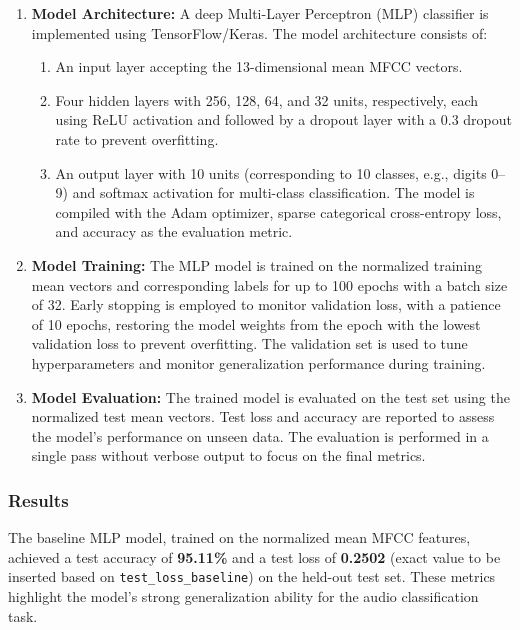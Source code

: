 \documentclass[12pt]{article}
\begin{document}
\begin{enumerate}
    \item \textbf{Model Architecture:} A deep Multi-Layer Perceptron (MLP) classifier is implemented using TensorFlow/Keras. The model architecture consists of:

    \begin{enumerate}
        \item An input layer accepting the 13-dimensional mean MFCC vectors.
        \item Four hidden layers with 256, 128, 64, and 32 units, respectively, each using ReLU activation and followed by a dropout layer with a 0.3 dropout rate to prevent overfitting.
        \item An output layer with 10 units (corresponding to 10 classes, e.g., digits 0–9) and softmax activation for multi-class classification. The model is compiled with the Adam optimizer, sparse categorical cross-entropy loss, and accuracy as the evaluation metric.
    \end{enumerate}


    \item \textbf{Model Training:} The MLP model is trained on the normalized training mean vectors and corresponding labels for up to 100 epochs with a batch size of 32. Early stopping is employed to monitor validation loss, with a patience of 10 epochs, restoring the model weights from the epoch with the lowest validation loss to prevent overfitting. The validation set is used to tune hyperparameters and monitor generalization performance during training.

    \item \textbf{Model Evaluation:} The trained model is evaluated on the test set using the normalized test mean vectors. Test loss and accuracy are reported to assess the model’s performance on unseen data. The evaluation is performed in a single pass without verbose output to focus on the final metrics.

\end{enumerate}




\subsubsection{Results}

The baseline MLP model, trained on the normalized mean MFCC features, achieved a test accuracy of \textbf{95.11\%} and a test loss of \textbf{0.2502} (exact value to be inserted based on \texttt{test\_loss\_baseline}) on the held-out test set. These metrics highlight the model's strong generalization ability for the audio classification task.
\end{document}
